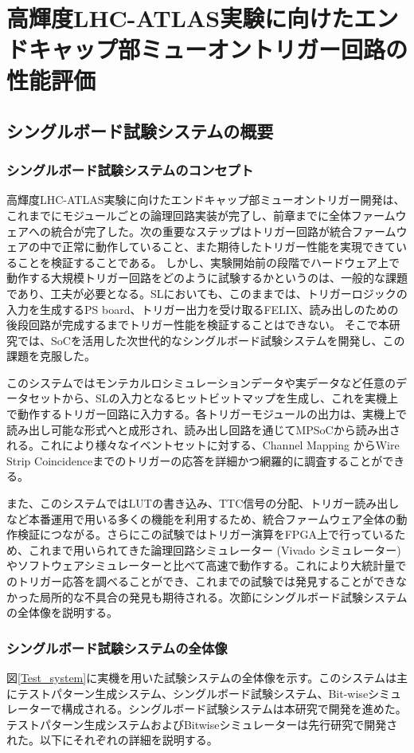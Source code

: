 　\chapter{高輝度LHC-ATLAS実験に向けたエンドキャップ部ミューオントリガー回路の性能評価}
\label{chap_TriggerTest}

\section{シングルボード試験システムの概要}
\subsection*{シングルボード試験システムのコンセプト}
高輝度LHC-ATLAS実験に向けたエンドキャップ部ミューオントリガー開発は、これまでにモジュールごとの論理回路実装が完了し、前章までに全体ファームウェアへの統合が完了した。次の重要なステップはトリガー回路が統合ファームウェアの中で正常に動作していること、また期待したトリガー性能を実現できていることを検証することである。
しかし、実験開始前の段階でハードウェア上で動作する大規模トリガー回路をどのように試験するかというのは、一般的な課題であり、工夫が必要となる。SLにおいても、このままでは、トリガーロジックの入力を生成するPS board、トリガー出力を受け取るFELIX、読み出しのための後段回路が完成するまでトリガー性能を検証することはできない。
そこで本研究では、SoCを活用した次世代的なシングルボード試験システムを開発し、この課題を克服した。

このシステムではモンテカルロシミュレーションデータや実データなど任意のデータセットから、SLの入力となるヒットビットマップを生成し、これを実機上で動作するトリガー回路に入力する。各トリガーモジュールの出力は、実機上で読み出し可能な形式へと成形され、読み出し回路を通じてMPSoCから読み出される。これにより様々なイベントセットに対する、Channel Mapping からWire Strip Coincidenceまでのトリガーの応答を詳細かつ網羅的に調査することができる。

また、このシステムではLUTの書き込み、TTC信号の分配、トリガー読み出しなど本番運用で用いる多くの機能を利用するため、統合ファームウェア全体の動作検証につながる。さらにこの試験ではトリガー演算をFPGA上で行っているため、これまで用いられてきた論理回路シミュレーター (Vivado シミュレーター) やソフトウェアシミュレーターと比べて高速で動作する。これにより大統計量でのトリガー応答を調べることができ、これまでの試験では発見することができなかった局所的な不具合の発見も期待される。次節にシングルボード試験システムの全体像を説明する。

\subsection*{シングルボード試験システムの全体像}
\label{subsec_TestSystemOverview}
図\ref{Test_system}に実機を用いた試験システムの全体像を示す。このシステムは主にテストパターン生成システム、シングルボード試験システム、Bit-wiseシミュレーターで構成される。シングルボード試験システムは本研究で開発を進めた。テストパターン生成システムおよびBitwiseシミュレーターは先行研究で開発された\cite{mt_yamashita}。以下にそれぞれの詳細を説明する。

